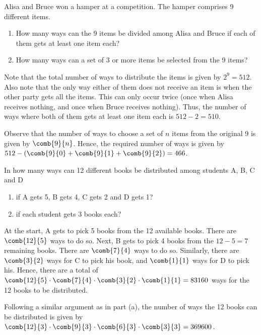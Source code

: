 \clearpage
\begin{problem}
    Alisa and Bruce won a hamper at a competition. The hamper comprises 9 different items.
    \begin{enumerate}
        \item How many ways can the 9 items be divided among Alisa and Bruce if each of them gets at least one item each?
        \item How many ways can a set of 3 or more items be selected from the 9 items?
    \end{enumerate}
\end{problem}
\begin{solution}
    \begin{ppart}
        Note that the total number of ways to distribute the items is given by $2^9 = 512$. Also note that the only way either of them does not receive an item is when the other party gets all the items. This can only occur twice (once when Alisa receives nothing, and once when Bruce receives nothing). Thus, the number of ways where both of them gets at least one item each is $512 - 2 = 510$.
    \end{ppart}
    \begin{ppart}
        Observe that the number of ways to choose a set of $n$ items from the original 9 is given by $\comb{9}{n}$. Hence, the required number of ways is given by $512 - (\comb{9}{0} + \comb{9}{1} + \comb{9}{2}) = 466$.
    \end{ppart}
\end{solution}

\begin{problem}
    In how many ways can 12 different books be distributed among students A, B, C and D
    \begin{enumerate}
        \item if A gets 5, B gets 4, C gets 2 and D gets 1?
        \item if each student gets 3 books each?
    \end{enumerate}
\end{problem}
\begin{solution}
    \begin{ppart}
        At the start, A gets to pick 5 books from the 12 available books. There are $\comb{12}{5}$ ways to do so. Next, B gets to pick 4 books from the $12 - 5 = 7$ remaining books. There are $\comb{7}{4}$ ways to do so. Similarly, there are $\comb{3}{2}$ ways for C to pick his book, and $\comb{1}{1}$ ways for D to pick his. Hence, there are a total of $\comb{12}{5} \cdot \comb{7}{4} \cdot \comb{3}{2} \cdot \comb{1}{1} = 83160$ ways for the 12 books to be distributed.
    \end{ppart}
    \begin{ppart}
        Following a similar argument as in part (a), the number of ways the 12 books can be distributed is given by $\comb{12}{3} \cdot \comb{9}{3} \cdot \comb{6}{3} \cdot \comb{3}{3} = 369600$.
    \end{ppart}
\end{solution}


